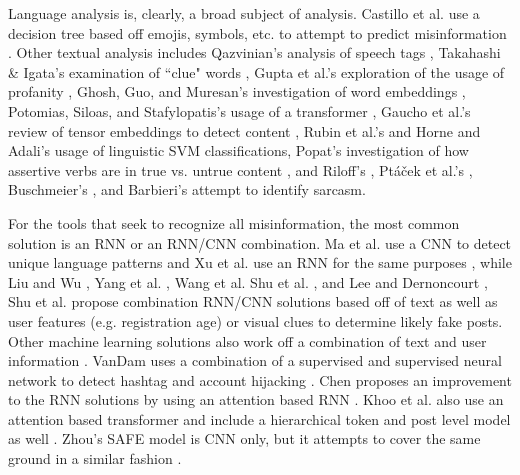 \documentclass[preprint,review,12pt]{elsarticle}
\begin{document}
Language analysis is, clearly, a broad subject of analysis.  Castillo et al. use a decision tree based off emojis, symbols, etc. to attempt to predict misinformation \cite{castillo2011information}. Other textual analysis includes Qazvinian's analysis of speech tags \cite{qazvinian2011rumor}, Takahashi \& Igata's examination of ``clue" words \cite{takahashi2012rumor}, Gupta et al.'s exploration of the usage of profanity \cite{gupta2014tweetcred}, Ghosh, Guo, and Muresan's investigation of word embeddings \cite{ghosh2015sarcastic}, Potomias, Siloas, and Stafylopatis's usage of a transformer \cite{potamias2020transformer}, Gaucho et al.'s review of tensor embeddings to detect content \cite{guacho2018semi}, Rubin et al.'s \cite{rubin2016fake} and Horne and Adali's \cite{horne2017just} usage of linguistic SVM classifications, Popat's investigation of how assertive verbs are in true vs. untrue content \cite{popat2017assessing}, and Riloff's \cite{riloff2013sarcasm}, Pt{\'a}{\v{c}}ek et al.'s \cite{ptavcek2014sarcasm}, Buschmeier's \cite{buschmeier2014impact}, and Barbieri's \cite{barbieri2014modelling} attempt to identify sarcasm.

For the tools that seek to recognize all misinformation, the most common solution is an RNN or an RNN/CNN combination. Ma et al. use a CNN to detect unique language patterns \cite{ma2018rumor} and Xu et al. use an RNN for the same purposes \cite{xu2019deep}, while Liu and Wu \cite{liu2018early}, Yang et al. \cite{yang2012automatic}, Wang et al. \cite{wang2018eann} Shu et al. \cite{shu2019role}, and Lee and Dernoncourt \cite{lee2016sequential}, Shu et al. \cite{shu2019beyond,shu2020leveraging} propose combination RNN/CNN solutions based off of text as well as user features (e.g. registration age) or visual clues to determine likely fake posts.  Other machine learning solutions also work off a combination of text and user information \cite{sun2013detecting,kwon2017rumor,ma2015detect,ma2016detecting,zhao2015enquiring}. VanDam uses a combination of a supervised and supervised neural network to detect hashtag and account hijacking \cite{vandam2019learning}. Chen proposes an improvement to the RNN solutions by using an attention based RNN \cite{chen2018call}. Khoo et al. also use an attention based transformer and include a hierarchical token and post level model as well \cite{khoo2020interpretable}. Zhou's SAFE model is CNN only, but it attempts to cover the same ground in a similar fashion \cite{zhou2020mathsf}.
\end{document}
